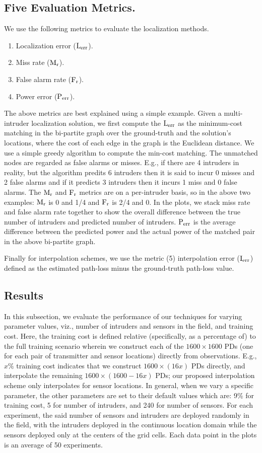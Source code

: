 \subsection{Five Evaluation Metrics.}
We use the following metrics to evaluate the localization methods. 
\begin{enumerate}
\item Localization error ($\mathrm{L_{err}}$). 
\item Miss rate ($\mathrm{M_{r}}$).
\item False alarm rate ($\mathrm{F_{r}}$).
\item Power error ($\mathrm{P_{err}}$).
\end{enumerate}
The above metrics are best explained using a simple example. Given a
multi-intruder localization solution, we first compute the $\mathrm{L_{err}}$ as
the minimum-cost matching in the bi-partite graph over the
ground-truth and the solution's locations, where the cost of each edge
in the graph is the Euclidean distance. We use a simple greedy
algorithm to compute the min-cost matching.
The unmatched nodes are regarded as false alarms or misses. E.g., if
there are 4 intruders in reality, but the algorithm predits 6
intruders then it is said to incur 0 misses and 2 false alarms and if
it predicts 3 intruders then it incurs 1 miss and 0 false alarms. The
$\mathrm{M_{r}}$ and $\mathrm{F_{r}}$ metrics are on a per-intruder basis, so in the above
two examples: $\mathrm{M_{r}}$ is 0 and 1/4 and $\mathrm{F_{r}}$ is 2/4 and 0. In the plots, we stack miss rate and false alarm rate together to show the overall difference between the true number of intruders and predicted number of intruders.
$\mathrm{P_{err}}$ is the average difference between the predicted power
and the actual power of the matched pair in the above bi-partite
graph. 

Finally for interpolation schemes, we use the metric (5) interpolation error ($\mathrm{I_{err}}$) defined as the estimated path-loss minus the ground-truth path-loss value.

\subsection{Results}

In this subsection, we evaluate the performance of our techniques for
varying parameter values, viz., number of intruders and sensors in the
field, and training cost.
Here, the training cost is defined relative (specifically, as a
percentage of) to the full training scenario wherein we construct each
of the $1600 \times 1600$ PDs (one for each pair of transmitter and
sensor locations) directly from observations. E.g., $x\%$ training
cost indicates that we construct $1600 \times (16x)$ PDs directly, and
interpolate the remaining $1600 \times (1600-16x)$ PDs; our proposed
interpolation scheme only interpolates for sensor locations.
In general, when we vary a specific parameter, the other parameters
are set to their default values which are: 9\% for training
cost, 5 for number of intruders, and 240 for number of sensors.
For each experiment, the said number of sensors and intruders are
deployed randomly in the field, with the intruders deployed in the
continuous location domain while the sensors deployed only at the
centers of the grid cells. Each data point in the plots is an
average of 50 experiments.

